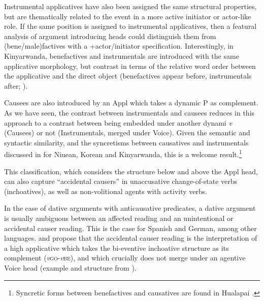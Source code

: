 \documentclass[output=paper,colorlinks,citecolor=brown,nonflat]{./langscibook}
\begin{document}
Instrumental applicatives have also been assigned the same structural properties, but are thematically related to the event in a more active initiator or actor-like role. If the same position is assigned to instrumental applicatives, then a featural analysis of argument introducing heads could distinguish them from (bene/male)factives with a +actor/initiator specification. Interestingly, in Kinyarwanda, benefactives and instrumentals are introduced with the same applicative morphology, but contrast in terms of the relative word order between the applicative and the direct object (benefactives appear before, instrumentals after; \citealt{McGinnisGerdts2004}).

Causees are also introduced by an Appl which takes a dynamic \liv P as complement. As we have seen, the contrast between instrumentals and causees reduces in this approach to a contrast between being embedded under another dynami \textit{v} (Causees) or not (Instrumentals, merged under Voice). Given the semantic and syntactic similarity, and the syncretisms between causatives and instrumentals discussed in  for Niuean, Korean and Kinyarwanda, this is a welcome result.\footnote{Syncretic forms between benefactives and causatives are found in Hualapai \citep{Peterson2007}.}

This classification, which considers the structure below and above the Appl head, can also capture “accidental causers” in unaccusative change-of-state verbs (inchoatives), as well as non-volitional agents with activity verbs.

In the case of dative arguments with anticausative predicates, a dative argument is usually ambiguous between an affected reading and an unintentional or accidental causer reading. This is the case for Spanish and German, among other languages. \citet{Cuervo2003,Cuervo2014} and \citet{Schäfer2008} propose that the accidental causer reading is the interpretation of a high applicative which takes the bi-eventive inchoative structure as its complement (\textit{v}\textsc{go}-\textit{v}\textsc{be}), and which crucially does not merge under an agentive Voice head (example and structure from \citealt[166--167]{Cuervo2003}).
\end{document}
